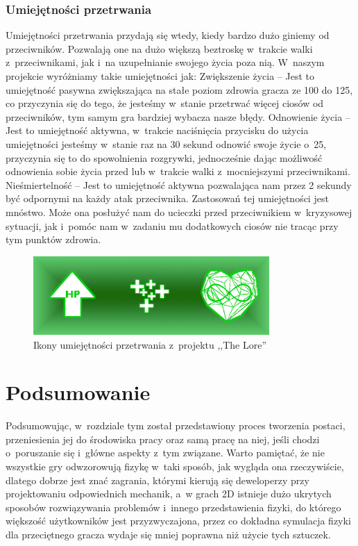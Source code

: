 \documentclass[oneside,polski,logo]{amuthesis}
\begin{document}
\subsubsection{Umiejętności przetrwania}
Umiejętności przetrwania przydają się wtedy, kiedy bardzo dużo giniemy od przeciwników. Pozwalają one na dużo większą beztroskę w~trakcie walki z~przeciwnikami, jak i~na uzupełnianie swojego życia poza nią. W~naszym projekcie wyróżniamy takie umiejętności jak:
Zwiększenie życia – Jest to umiejętność pasywna zwiększająca na stałe poziom zdrowia gracza ze 100 do 125, co przyczynia się do tego, że jesteśmy w~stanie przetrwać więcej ciosów od przeciwników, tym samym gra bardziej wybacza nasze błędy.
Odnowienie życia – Jest to umiejętność aktywna, w~trakcie naciśnięcia przycisku do użycia umiejętności jesteśmy w~stanie raz na 30 sekund odnowić swoje życie o~25, przyczynia się to do spowolnienia rozgrywki, jednocześnie dając możliwość odnowienia sobie życia przed lub w~trakcie walki z~mocniejszymi przeciwnikami.
Nieśmiertelność – Jest to umiejętność aktywna pozwalająca nam przez 2 sekundy być odpornymi na każdy atak przeciwnika. Zastosowań tej umiejętności jest mnóstwo. Może ona posłużyć nam do ucieczki przed przeciwnikiem w~kryzysowej sytuacji, jak i~pomóc nam w~zadaniu mu dodatkowych ciosów nie tracąc przy tym punktów zdrowia. 


\begin{figure}[h]
	\centering
	\includegraphics[width=9cm]{images/kozubal/patience.png}
	\caption{Ikony umiejętności przetrwania z~projektu ,,The Lore''}
\end{figure}

\section{Podsumowanie}
Podsumowując, w~rozdziale tym został przedstawiony proces tworzenia postaci, przeniesienia jej do środowiska pracy oraz samą pracę na niej, jeśli chodzi o~poruszanie się i~główne aspekty z~tym związane. Warto pamiętać, że nie wszystkie gry odwzorowują fizykę w~taki sposób, jak wygląda ona rzeczywiście, dlatego dobrze jest znać zagrania, którymi kierują się deweloperzy przy projektowaniu odpowiednich mechanik, a~w grach 2D istnieje dużo ukrytych sposobów rozwiązywania problemów i~innego przedstawienia fizyki, do którego większość użytkowników jest przyzwyczajona, przez co dokładna symulacja fizyki dla przeciętnego gracza wydaje się mniej poprawna niż użycie tych sztuczek.
\end{document}
